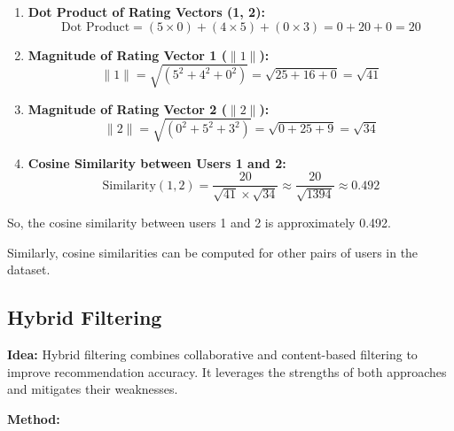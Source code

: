 \documentclass[a4paper]{article}
\theoremstyle{plain}
\theoremstyle{definition}
\begin{document}
            \begin{enumerate}
                \item \textbf{Dot Product of Rating Vectors (1, 2):}
                \[
                \text{Dot Product} = (5 \times 0) + (4 \times 5) + (0 \times 3) = 0 + 20 + 0 = 20
                \]
                
                \item \textbf{Magnitude of Rating Vector 1 ($\|1\|$):}
                \[
                \|1\| = \sqrt{(5^2 + 4^2 + 0^2)} = \sqrt{25 + 16 + 0} = \sqrt{41}
                \]
                
                \item \textbf{Magnitude of Rating Vector 2 ($\|2\|$):}
                \[
                \|2\| = \sqrt{(0^2 + 5^2 + 3^2)} = \sqrt{0 + 25 + 9} = \sqrt{34}
                \]
                
                \item \textbf{Cosine Similarity between Users 1 and 2:}
                \[
                \text{Similarity}(1, 2) = \frac{20}{{\sqrt{41} \times \sqrt{34}}} \approx \frac{20}{\sqrt{1394}} \approx 0.492
                \]
            \end{enumerate}
            
            So, the cosine similarity between users 1 and 2 is approximately 0.492.
            
            Similarly, cosine similarities can be computed for other pairs of users in the dataset.


    \subsection{Hybrid Filtering}

        \textbf{Idea:}
        Hybrid filtering combines collaborative and content-based filtering to improve recommendation accuracy. It leverages the strengths of both approaches and mitigates their weaknesses.
        
        \textbf{Method:}
        
\end{document}
